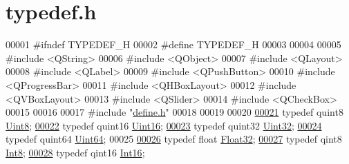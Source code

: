 \hypertarget{a00004_source}{\section{typedef.\+h}
\label{a00004_source}
}

\begin{DoxyCode}
00001 \textcolor{preprocessor}{#ifndef TYPEDEF\_H}
00002 \textcolor{preprocessor}{#define TYPEDEF\_H}
00003 
00004 
00005 \textcolor{preprocessor}{#include <QString>}
00006 \textcolor{preprocessor}{#include <QObject>}
00007 \textcolor{preprocessor}{#include <QLayout>}
00008 \textcolor{preprocessor}{#include <QLabel>}
00009 \textcolor{preprocessor}{#include <QPushButton>}
00010 \textcolor{preprocessor}{#include <QProgressBar>}
00011 \textcolor{preprocessor}{#include <QHBoxLayout>}
00012 \textcolor{preprocessor}{#include <QVBoxLayout>}
00013 \textcolor{preprocessor}{#include <QSlider>}
00014 \textcolor{preprocessor}{#include <QCheckBox>}
00015 
00016 
00017 \textcolor{preprocessor}{#include "\hyperlink{a00090}{define.h}"}
00018 
00019 
00020 
\hypertarget{a00004_source_l00021}{}\hyperlink{a00004_a979e3e23b9a449e69ab6a8a83b6042f8}{00021} \textcolor{keyword}{typedef} quint8               \hyperlink{a00004_a979e3e23b9a449e69ab6a8a83b6042f8}{Uint8};
\hypertarget{a00004_source_l00022}{}\hyperlink{a00004_aae7407b021d43f7193a81a58cfb3e297}{00022} \textcolor{keyword}{typedef} quint16              \hyperlink{a00004_aae7407b021d43f7193a81a58cfb3e297}{Uint16};
\hypertarget{a00004_source_l00023}{}\hyperlink{a00004_ab56a7153a5b218eac7698ff141009735}{00023} \textcolor{keyword}{typedef} quint32              \hyperlink{a00004_ab56a7153a5b218eac7698ff141009735}{Uint32};
\hypertarget{a00004_source_l00024}{}\hyperlink{a00004_a3ea80e954e940df6ac162951653f72c4}{00024} \textcolor{keyword}{typedef} quint64              \hyperlink{a00004_a3ea80e954e940df6ac162951653f72c4}{Uint64};
00025 
\hypertarget{a00004_source_l00026}{}\hyperlink{a00004_a87d38f886e617ced2698fc55afa07637}{00026} \textcolor{keyword}{typedef} \textcolor{keywordtype}{float}                \hyperlink{a00004_a87d38f886e617ced2698fc55afa07637}{Float32};
\hypertarget{a00004_source_l00027}{}\hyperlink{a00004_aafb609548b1aa0152c46f9205b79d0f0}{00027} \textcolor{keyword}{typedef} qint8                \hyperlink{a00004_aafb609548b1aa0152c46f9205b79d0f0}{Int8};
\hypertarget{a00004_source_l00028}{}\hyperlink{a00004_a3985266aecb120f269789241c170850c}{00028} \textcolor{keyword}{typedef} qint16               \hyperlink{a00004_a3985266aecb120f269789241c170850c}{Int16};

\end{DoxyCode}

